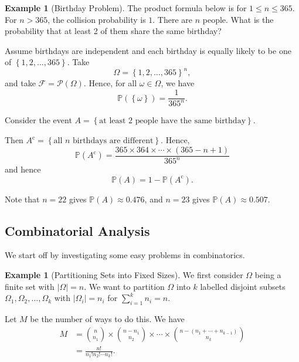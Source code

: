 \documentclass[11pt]{article}
\numberwithin{equation}{section}
\theoremstyle{definition}
\newtheorem{example}[theorem]{Example}
\theoremstyle{remark}
\newcommand{\pqty}[1]{\left(#1\right)}
\newcommand{\Bqty}[1]{\left\{#1\right\}}
\newcommand{\abs}[1]{\left|#1\right|}
\newcommand{\compl}{^{\mathrm c}}
\newcommand{\powerset}{\mathcal P}
\newcommand{\eventSpace}{\mathcal F}
\newcommand{\Prob}{\mathbb P}
\begin{document}
\begin{example}[Birthday Problem]\label{probability-example-005}
    \label{probability-ex:birthbay-problem}%
The product formula below is for \(1\le n\le365\). For \(n>365\), the collision probability is \(1\).
    There are \(n\) people. What is the probability that at least 2 of them share the same birthday?
        
    Assume birthdays are independent and each birthday is equally likely to be one of \(\Bqty{1, 2, \ldots, 365}\). Take
    \[
        \Omega = \Bqty{1, 2, \ldots, 365}^n,
    \]
    and take \(\eventSpace = \powerset\pqty{\Omega}\). Hence, for all \(\omega \in \Omega\), we have
    \[
        \Prob\pqty{\Bqty{\omega}} = \frac{1}{365^n}.
    \]

    Consider the event \(A = \Bqty{\text{at least 2 people have the same birthday}}\).

    Then \(A\compl = \Bqty{\text{all }n\text{ birthdays are different}}\). Hence,
    \[
        \Prob\pqty{A\compl} = \frac{365 \times 364 \times \cdots \times \pqty{365 - n + 1}}{365^n}
    \]
    and hence
    \[
        \Prob\pqty{A} = 1 - \Prob\pqty{A\compl}.
    \]

    Note that \(n = 22\) gives \(\Prob\pqty{A} \approx 0.476\), and \(n = 23\) gives \(\Prob\pqty{A} \approx 0.507\).
\end{example}

\subsection{Combinatorial Analysis}
We start off by investigating some easy problems in combinatorics.

\begin{example}[Partitioning Sets into Fixed Sizes]\label{probability-example-006}
    \label{probability-ex:partition-sets-given-size}%
    We first consider \(\Omega\) being a finite set with \(\abs{\Omega} = n\). We want to partition \(\Omega\) into \(k\) labelled disjoint subsets \(\Omega_1, \Omega_2, \ldots, \Omega_k\) with \(\abs{\Omega_i} = n_i\) for \(\sum_{i = 1}^{k} n_i = n\).

    Let \(M\) be the number of ways to do this. We have
    \begin{align*}
        M &= \binom{n}{n_1} \times \binom{n - n_1}{n_2} \times \cdots \times \binom{n - \pqty{n_1 + \cdots + n_{k - 1}}}{n_k} \\
        &= \frac{n!}{n_1! n_2! \cdots n_k!}.
    \end{align*}
\end{example}
\end{document}
